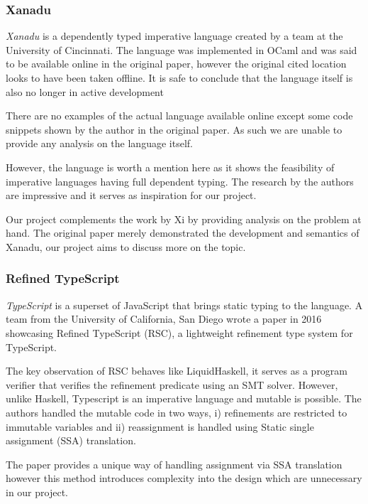 \documentclass[a4paper,12pt]{report}
\begin{document}
\subsubsection{Xanadu}
\textit{Xanadu} \cite{xanadu} is a dependently typed imperative language 
created by a team at 
the University of Cincinnati. The language was implemented in OCaml and was 
said to be available online in the original paper, however the original cited 
location looks to have been taken offline. It is safe to conclude that 
the language itself is also no longer in active development 

\par
There are no examples of the actual language available online except some code 
snippets shown by the author in the original paper. As such we are unable to 
provide any analysis on the language itself.

\par
However, the language is worth a mention here as it shows the feasibility of 
imperative languages having full dependent typing. The research by the authors 
are impressive and it serves as inspiration for our project. 

\par
Our project complements the work by Xi by providing analysis on the problem at 
hand. The original paper merely demonstrated the development and semantics of 
Xanadu, our project aims to discuss more on the topic. 

\subsubsection{Refined TypeScript}
\textit{TypeScript} is a superset of JavaScript that brings static typing to the 
language. A team from the University of California, San Diego wrote a paper \cite{rts} 
in 2016 showcasing Refined TypeScript (RSC), a lightweight refinement type 
system for TypeScript. 

\par
The key observation of RSC behaves like LiquidHaskell, it serves as a program 
verifier that verifies the refinement predicate using an SMT solver. However, unlike 
Haskell, Typescript is an imperative language and mutable is possible. 
The authors handled the mutable code in two ways, i) refinements are 
restricted to immutable variables and ii) reassignment is handled using 
Static single assignment (SSA) translation.

\par
The paper provides a unique way of handling assignment via SSA translation 
however this method introduces complexity into the design which are unnecessary 
in our project. 
\end{document}
